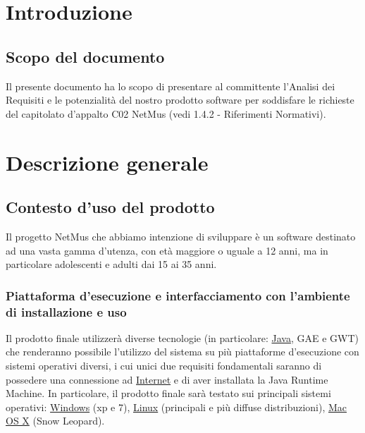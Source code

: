 \thispagestyle{fancy} %

\chapter{Introduzione}
\thispagestyle{fancy} %

\section{Scopo del documento}
Il presente documento ha lo scopo di presentare al committente l'Analisi dei
Requisiti e le potenzialit\`a del nostro prodotto software per soddisfare le
richieste del capitolato d'appalto C02 NetMus (vedi 1.4.2 - Riferimenti
Normativi).



\chapter{Descrizione generale}
\thispagestyle{fancy}

\section{Contesto d'uso del prodotto}
Il progetto NetMus che abbiamo intenzione di sviluppare \`e un software
destinato ad una vasta gamma d'utenza, con et\`a maggiore o uguale
a 12 anni, ma in particolare adolescenti e adulti dai 15 ai 35 anni.

\subsection{Piattaforma d'esecuzione e interfacciamento con l'ambiente di
installazione e uso}
Il prodotto finale utilizzer\`a diverse tecnologie (in particolare: \underline{Java}, GAE e
GWT) che renderanno possibile l'utilizzo del sistema su pi\`u piattaforme
d'esecuzione con sistemi operativi diversi, i cui unici due requisiti
fondamentali saranno di possedere una connessione ad \underline{Internet} e di aver
installata la Java Runtime Machine. In particolare, il prodotto finale sar\`a
testato sui principali sistemi operativi: \underline{Windows} (xp e 7), \underline{Linux} (principali e
pi\`u diffuse distribuzioni), \underline{Mac OS X} (Snow Leopard).
